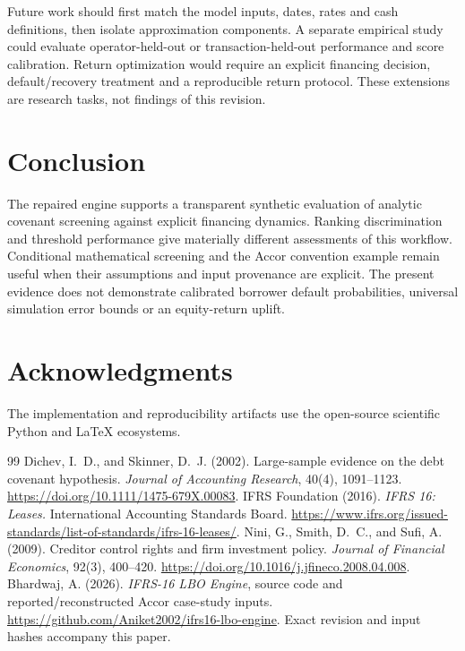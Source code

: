 \documentclass[11pt,a4paper]{article}
\theoremstyle{plain}
\theoremstyle{definition}
\begin{document}
Future work should first match the model inputs, dates, rates and cash
definitions, then isolate approximation components. A separate empirical study
could evaluate operator-held-out or transaction-held-out performance and score
calibration. Return optimization would require an explicit financing decision,
default/recovery treatment and a reproducible return protocol. These extensions
are research tasks, not findings of this revision.

\section{Conclusion}
The repaired engine supports a transparent synthetic evaluation of analytic
covenant screening against explicit financing dynamics. Ranking discrimination
and threshold performance give materially different assessments of this
workflow. Conditional mathematical screening and the Accor convention example
remain useful when their assumptions and input provenance are explicit. The
present evidence does not demonstrate calibrated borrower default probabilities,
universal simulation error bounds or an equity-return uplift.

\section*{Acknowledgments}
The implementation and reproducibility artifacts use the open-source scientific
Python and LaTeX ecosystems.

\begin{thebibliography}{99}
Dichev, I.~D., and Skinner, D.~J. (2002).
Large-sample evidence on the debt covenant hypothesis.
\emph{Journal of Accounting Research}, 40(4), 1091--1123.
\url{https://doi.org/10.1111/1475-679X.00083}.
IFRS Foundation (2016). \emph{IFRS 16: Leases.}
International Accounting Standards Board.
\url{https://www.ifrs.org/issued-standards/list-of-standards/ifrs-16-leases/}.
Nini, G., Smith, D.~C., and Sufi, A. (2009).
Creditor control rights and firm investment policy.
\emph{Journal of Financial Economics}, 92(3), 400--420.
\url{https://doi.org/10.1016/j.jfineco.2008.04.008}.
Bhardwaj, A. (2026). \emph{IFRS-16 LBO Engine}, source code and
reported/reconstructed Accor case-study inputs.
\url{https://github.com/Aniket2002/ifrs16-lbo-engine}.
Exact revision and input hashes accompany this paper.
\end{thebibliography}
\end{document}

